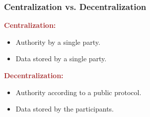 \documentclass{beamer}
\begin{document}
\begin{frame}
  \frametitle{Centralization vs. Decentralization}
	\begin{block}{\textbf{\textcolor{brown}{Centralization:}}}
	\begin{itemize}
		\item Authority by a single party.
		\item Data stored by a single party.
	\end{itemize}
	\end{block}

    \pause
    
	\begin{block}{\textbf{\textcolor{brown}{Decentralization:}}}
	\begin{itemize}
		\item Authority according to a public protocol.
		\item Data stored by the participants.
	\end{itemize}
	\end{block}
	
	\pause
	

\end{frame}
\end{document}
